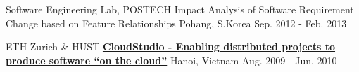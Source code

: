 \begin{cventries}
\cventry
{Software Engineering Lab, POSTECH } %
{Impact Analysis of Software Requirement Change based on Feature Relationships} %
{Pohang, S.Korea} %
{Sep. 2012 - Feb. 2013} %
{
}
    
\cventry
{{ETH Zurich} \&  HUST} %
{\href{http://se.inf.ethz.ch/research/cloudstudio/}{\bf CloudStudio - Enabling distributed projects to produce software “on the cloud”}} %
{Hanoi, Vietnam} %
{Aug. 2009 - Jun. 2010} %
{
}

\end{cventries}
